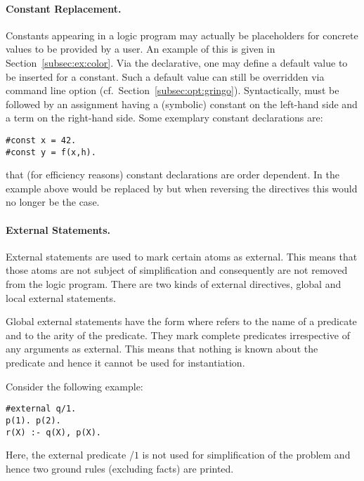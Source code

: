 \paragraph{Constant Replacement.}
%
Constants appearing in a logic program may actually be placeholders for
concrete values to be provided by a user.
An example of this is given in Section~\ref{subsec:ex:color}.
Via the  declarative,
one may define a default value to be inserted for a constant.
Such a default value can still be overridden via command line option
 (cf.\ Section~\ref{subsec:opt:gringo}).
Syntactically,  must be followed by an assignment having
a (symbolic) constant on the left-hand side and a term on the right-hand side.
Some exemplary constant declarations are:
%
\begin{lstlisting}[numbers=none]
#const x = 42.
#const y = f(x,h).
\end{lstlisting}

\begin{Note}
that (for efficiency reasons) constant declarations are order dependent.
In the example above  would be replaced by 
but when reversing the directives this would no longer be the case.
\end{Note}



\paragraph{External Statements.}
%
External statements are used to mark certain atoms as external. This means 
that those atoms are not subject of simplification and consequently are not removed 
from the logic program. There are two kinds of external directives, 
global and local external statements.

Global external statements have the form  where 
 refers to the name of a predicate and  to the arity of the predicate.
They mark complete predicates irrespective of any arguments as external.
This means that nothing is known about the predicate and hence it cannot be used 
for instantiation.
\begin{example}
Consider the following example:
\begin{lstlisting}[numbers=none]
#external q/1.
p(1). p(2).
r(X) :- q(X), p(X).
\end{lstlisting}
Here, the external predicate /$1$ is not used for simplification
of the problem and hence two ground rules (excluding facts) are printed.
\eexample
\end{example}

